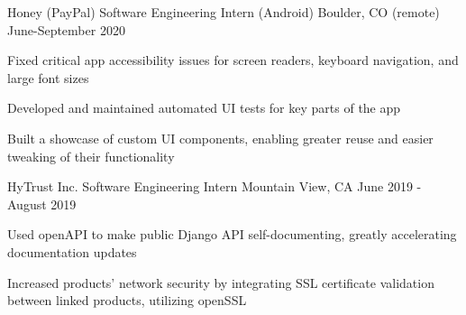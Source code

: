 \documentclass[12pt, a4paper]{awesome-cv}
\begin{document}
\makecvheader


\begin{cventries}

  \cventry
    {Honey (PayPal)}
    {Software Engineering Intern (Android)}
    {Boulder, CO (remote)}
    {June-September 2020}
    {
        \begin{cvitems}
            \item {Fixed critical app accessibility issues for screen readers, keyboard navigation, and large font sizes}
            \item {Developed and maintained automated UI tests for key parts of the app}
            \item {Built a showcase of custom UI components, enabling greater reuse and easier tweaking of their functionality}
        \end{cvitems}
    }

  \cventry
    {HyTrust Inc.}
    {Software Engineering Intern}
    {Mountain View, CA}
    {June 2019 - August 2019}
    {
      \begin{cvitems}
      	\item {Used openAPI to make public Django API self-documenting, greatly accelerating documentation updates}
	      \item {Increased products' network security by integrating SSL certificate validation between linked products, utilizing openSSL}
      \end{cvitems}
    }




\end{cventries}
\end{document}

